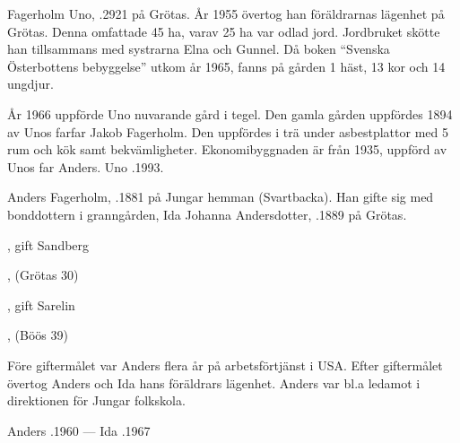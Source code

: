


Fagerholm Uno, .2921 på Grötas. År 1955 övertog han föräldrarnas lägenhet på Grötas. Denna omfattade 45 ha, varav 25 ha var odlad jord. Jordbruket skötte han tillsammans med systrarna Elna och Gunnel. Då boken ``Svenska Österbottens bebyggelse'' utkom år 1965, fanns på gården 1 häst, 13 kor och 14 ungdjur.

År 1966 uppförde Uno nuvarande gård i tegel. Den gamla gården uppfördes 1894 av Unos farfar Jakob Fagerholm. Den uppfördes i trä under asbestplattor med 5 rum och kök samt bekvämligheter. Ekonomibyggnaden är från 1935, uppförd av Unos far Anders.
Uno .1993.


Anders Fagerholm, .1881 på Jungar hemman (Svartbacka). Han gifte sig med bonddottern i granngården, Ida Johanna Andersdotter, .1889 på Grötas.
\begin{jhchildren}
  \item {}, gift Sandberg
  \item {}
  \item {}
  \item {}, (Grötas 30)
  \item {}
  \item {}, gift Sarelin
  \item {}, (Böös 39)
  \item {}
\end{jhchildren}

Före giftermålet var Anders flera år på arbetsförtjänst i USA. Efter giftermålet övertog Anders och Ida hans föräldrars lägenhet. Anders var bl.a ledamot i direktionen för Jungar folkskola.

Anders .1960  --- Ida .1967


